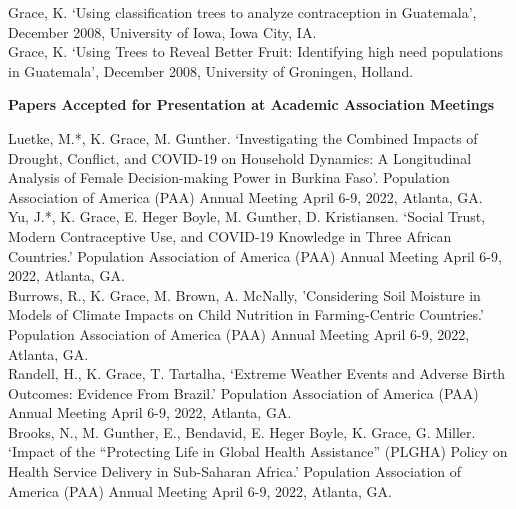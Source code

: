 \documentclass[11pt]{article} %
\begin{document}
\noindent
Grace, K. `Using classification trees to analyze contraception in Guatemala', December 2008, University of Iowa, Iowa City, IA.\\

\noindent
Grace, K. `Using Trees to Reveal Better Fruit: Identifying high need populations in Guatemala', December 2008, University of Groningen, Holland.\\
 

\vspace{.5cm}


\noindent
\textbf {Papers Accepted for Presentation at Academic Association Meetings }

\noindent

\noindent
Luetke, M.*, K. Grace, M. Gunther. `Investigating the Combined Impacts of Drought, Conflict, and COVID-19 on Household Dynamics: A Longitudinal Analysis of Female Decision-making Power in Burkina Faso'. Population Association of America (PAA) Annual Meeting April 6-9, 2022, Atlanta, GA.\\

\noindent
Yu, J.*, K. Grace, E. Heger Boyle, M. Gunther, D. Kristiansen. `Social Trust, Modern Contraceptive Use, and COVID-19 Knowledge in Three African Countries.' Population Association of America (PAA) Annual Meeting April 6-9, 2022, Atlanta, GA.\\

\noindent
Burrows, R., K. Grace, M. Brown, A. McNally, 'Considering Soil Moisture in Models of Climate Impacts on Child Nutrition in Farming-Centric Countries.' Population Association of America (PAA) Annual Meeting April 6-9, 2022, Atlanta, GA.\\

\noindent
Randell, H., K. Grace, T. Tartalha, `Extreme Weather Events and Adverse Birth Outcomes: Evidence From Brazil.' Population Association of America (PAA) Annual Meeting April 6-9, 2022, Atlanta, GA.\\

\noindent
Brooks, N., M. Gunther, E., Bendavid, E. Heger Boyle, K. Grace, G. Miller. `Impact of the “Protecting Life in Global Health Assistance” (PLGHA) Policy on Health Service Delivery in Sub-Saharan Africa.' Population Association of America (PAA) Annual Meeting April 6-9, 2022, Atlanta, GA.\\
\end{document}

